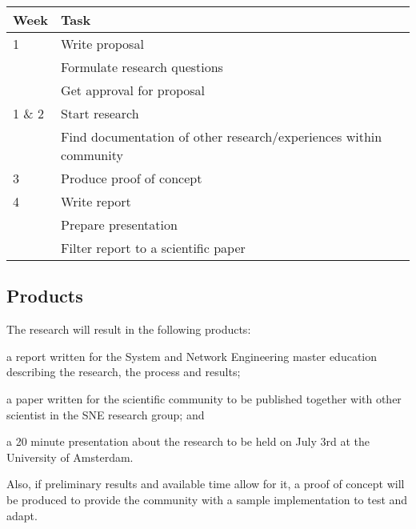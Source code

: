 \documentclass[oneside,twocolumn,7pt,a4paper]{article}
\begin{document}
		\begin{tabular}{l p{5.8cm}}
			Week & Task \\ \hline
				1 & Write proposal\\
					& Formulate research questions\\
					& Get approval for proposal \\ \hline
				1 \& 2 & Start research\\ 
					& Find documentation of other research/experiences within community \\ \hline
				3 & Produce proof of concept\\  \hline
				4 & Write report\\ 
					& Prepare presentation\\
					& Filter report to a scientific paper \\
		\end{tabular}
		
		\subsection*{Products} %
		\label{sub:products}
			The research will result in the following products: 
			\begin{inparaenum}
				\item a report written for the System and Network Engineering master education describing the research, the process and results;
				\item a paper written for the scientific community to be published together with other scientist in the SNE research group; and
				\item a 20 minute presentation about the research to be held on July 3rd at the University of Amsterdam.
			\end{inparaenum}
			Also, if preliminary results and available time allow for it, a proof of concept will be produced to provide the community with a sample implementation to test and adapt.
	
	
	
	
\end{document}
